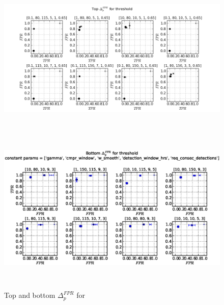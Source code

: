 \begin{figure}[!h]
\begin{center}
\includegraphics[height=3in]{../fig/final/top_fpr/threshold}
\includegraphics[height=3in]{../fig/final/bottom_fpr/threshold}
\end{center}
\caption{\label{fig:delta_top_bottom3f} Top and bottom $\Delta_p^{FPR}$ for }
\end{figure}


